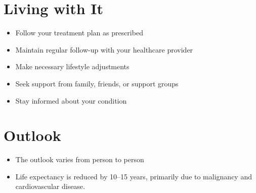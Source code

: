 \section{Living with It}
\begin{itemize}[noitemsep]
  \item Follow your treatment plan as prescribed
  \item Maintain regular follow-up with your healthcare provider
  \item Make necessary lifestyle adjustments
  \item Seek support from family, friends, or support groups
  \item Stay informed about your condition
\end{itemize}
\section{Outlook}
\begin{itemize}[noitemsep]
  \item The outlook varies from person to person
  \item Life expectancy is reduced by 10--15 years, primarily due to malignancy and cardiovascular disease.
\end{itemize}
